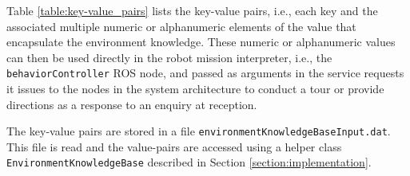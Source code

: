 \documentclass{CSSRforAfrica}
\begin{document}


Table \ref{table:key-value_pairs} lists the key-value pairs, i.e., each key and the associated multiple numeric or alphanumeric elements of the value that encapsulate the environment knowledge.  These numeric or alphanumeric values can then be used directly in the robot mission interpreter, i.e., the {\small \tt behaviorController} ROS node, and passed as arguments in the service requests it issues to the nodes in the system architecture to conduct a tour or provide directions as a response to an enquiry at reception.

The key-value pairs are stored in a file {\tt \small environmentKnowledgeBaseInput.dat}. This file is read and the value-pairs are accessed using a helper class {\tt \small EnvironmentKnowledgeBase} described in Section \ref{section:implementation}.  
 
\end{document}
